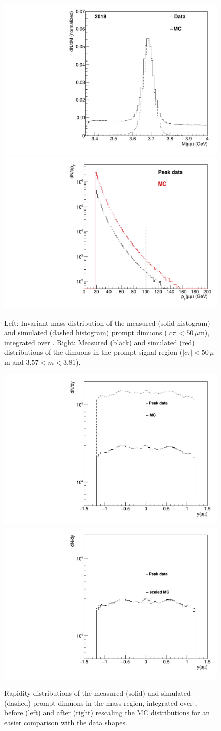 \begin{figure}[h!]
\centering
\includegraphics[width=0.485\linewidth]{Figures/chapter2/m_scale_psip.pdf}
\includegraphics[width=0.475\linewidth]{Figures/chapter2/pt_all_psip.pdf}
\caption{Left: Invariant mass distribution of the measured (solid histogram) 
and simulated (dashed histogram) prompt dimuons ($|c\tau| < 50\,\mu$m), 
integrated over \pt.
Right: Measured (black) and simulated (red) \pt distributions of the dimuons 
in the prompt \psip signal region 
($|c\tau| < 50\,\mu$m and $3.57 < m < 3.81$\GeV).}
\label{fig:psip_mass_pt}
\centering
\includegraphics[width=0.45\linewidth]{Figures/chapter2/y_all_psip.pdf}
\includegraphics[width=0.45\linewidth]{Figures/chapter2/y_scale_psip.pdf}
\caption{Rapidity distributions of the measured (solid) 
and simulated (dashed) prompt dimuons in the \psip mass region, 
integrated over \pt,
before (left) and after (right) rescaling the MC distributions 
for an easier comparison with the data shapes.}
\label{fig:psip_y}
\end{figure}




